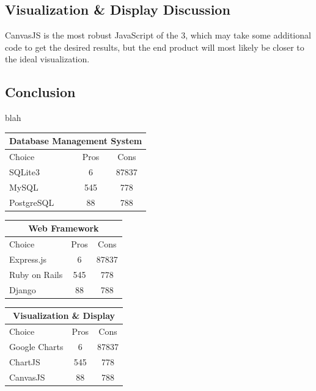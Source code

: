 \documentclass[onecolumn, draftclsnofoot,10pt, compsoc]{IEEEtran}
\begin{document}
\begin{singlespace}
\subsection{Visualization \& Display Discussion}
CanvasJS is the most robust JavaScript of the 3, which may take some additional code to get the desired results, but the end product will most likely be closer to the ideal visualization. 
\subsection{Conclusion}
blah


\begin{center}
 \begin{tabular}{|l|c|c|} 
 \hline
 \multicolumn{3}{|c|}{Database Management System} \\
 \hline
 Choice & Pros & Cons\\ [0.5ex] 
 \hline\hline
 SQLite3 & 6 & 87837 \\ 
 \hline
 MySQL & 545 & 778\\
 \hline
 PostgreSQL & 88 & 788\\ [1ex] 
 \hline
\end{tabular}
 \begin{tabular}{|l|c|c|} 
 \hline
 \multicolumn{3}{|c|}{Web Framework} \\
 \hline
 Choice & Pros & Cons\\ [0.5ex] 
 \hline\hline
 Express.js & 6 & 87837 \\ 
 \hline
 Ruby on Rails & 545 & 778\\
 \hline
 Django & 88 & 788\\ [1ex] 
 \hline
\end{tabular}
 \begin{tabular}{|l|c|c|} 
 \hline
 \multicolumn{3}{|c|}{Visualization \& Display} \\
 \hline
 Choice & Pros & Cons\\ [0.5ex] 
 \hline\hline
 Google Charts & 6 & 87837 \\ 
 \hline
 ChartJS & 545 & 778\\
 \hline
 CanvasJS & 88 & 788\\ [1ex] 
 \hline
\end{tabular}
\end{center}





\end{singlespace}
\end{document}
